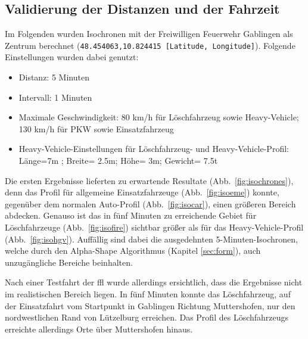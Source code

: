 \newpage
\subsection{Validierung der Distanzen und der Fahrzeit}

Im Folgenden wurden Isochronen mit der Freiwilligen Feuerwehr Gablingen als Zentrum berechnet (\texttt{48.454063,10.824415 [Latitude, Longitude]}).
Folgende Einstellungen wurden dabei genutzt:
\sloppy
\begin{itemize}
\item Distanz: 5 Minuten
\item Intervall: 1 Minuten
\item Maximale Geschwindigkeit: 80 km/h für Löschfahrzeug sowie Heavy-Vehicle; 130 km/h für PKW sowie Einsatzfahrzeug
\item Heavy-Vehicle-Einstellungen für Löschfahrzeug- und Heavy-Vehicle-Profil: Länge=7m ; Breite= 2.5m; Höhe= 3m; Gewicht= 7.5t
\end{itemize}
\fussy

Die ersten Ergebnisse lieferten zu erwartende Resultate (Abb.~\ref{fig:isochrones}), denn das Profil für allgemeine Einsatzfahrzeuge (Abb.~\ref{fig:isoeme}) konnte, gegenüber dem normalen Auto-Profil (Abb.~\ref{fig:isocar}), einen größeren Bereich abdecken.
Genauso ist das in fünf Minuten zu erreichende Gebiet für Löschfahrzeuge (Abb.~\ref{fig:isofire}) sichtbar größer als für das Heavy-Vehicle-Profil (Abb.~\ref{fig:isohgv}).
Auffällig sind dabei die ausgedehnten 5-Minuten-Isochronen, welche durch den Alpha-Shape Algorithmus (Kapitel \ref{sec:form}), auch unzugängliche Bereiche beinhalten.

Nach einer Testfahrt der \gls{ffl} wurde allerdings ersichtlich, dass die Ergebnisse nicht im realistischen Bereich liegen.
In fünf Minuten konnte das Löschfahrzeug, auf der Einsatzfahrt vom Startpunkt in Gablingen Richtung Muttershofen, nur den nordwestlichen Rand von Lützelburg erreichen.
Das Profil des Löschfahrzeugs erreichte allerdings Orte über Muttershofen hinaus.

